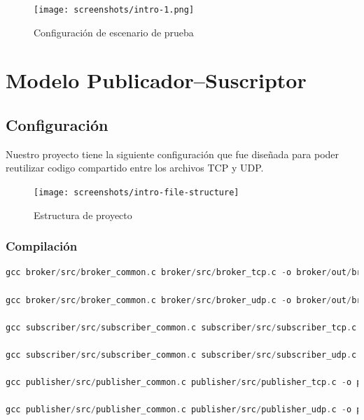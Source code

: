 \documentclass[10pt]{article}
\begin{document}
\begin{figure}[H]
    \centering
    \texttt{[image: screenshots/intro-1.png]}
    \caption{Configuración de escenario de prueba}
\end{figure}



\section{Modelo Publicador–Suscriptor}

\subsection{Configuración}
Nuestro proyecto tiene la siguiente configuración que fue diseñada para poder reutilizar codigo compartido entre los archivos TCP y UDP.

\begin{figure}[H]
    \centering
    \texttt{[image: screenshots/intro-file-structure]}
    \caption{Estructura de proyecto}
\end{figure}

\subsubsection{Compilación}

\begin{lstlisting}[language=C, caption={}]
gcc broker/src/broker_common.c broker/src/broker_tcp.c -o broker/out/broker_tcp -Wall -Wextra -std=c11 -O2

gcc broker/src/broker_common.c broker/src/broker_udp.c -o broker/out/broker_udp -Wall -Wextra -std=c11 -O2

gcc subscriber/src/subscriber_common.c subscriber/src/subscriber_tcp.c -o subscriber/out/subscriber_tcp -Wall -Wextra -std=c11 -O2

gcc subscriber/src/subscriber_common.c subscriber/src/subscriber_udp.c -o subscriber/out/subscriber_udp -Wall -Wextra -std=c11 -O2

gcc publisher/src/publisher_common.c publisher/src/publisher_tcp.c -o publisher/out/publisher_tcp -Wall -Wextra -std=c11 -O2

gcc publisher/src/publisher_common.c publisher/src/publisher_udp.c -o publisher/out/publisher_udp -Wall -Wextra -std=c11 -O2
\end{lstlisting}
\end{document}

